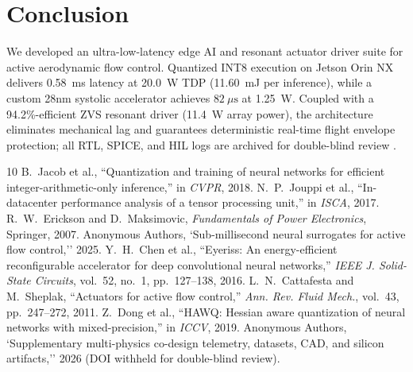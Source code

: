 \documentclass[journal,10pt,twocolumn]{IEEEtran}
\begin{document}
\begin{table}[h]
\caption{Hardware-in-the-Loop Closed-Loop Real-Time Profiling}
\label{tab:hil_val}
\centering
\footnotesize
{}
\end{table}

\section{Conclusion}
We developed an ultra-low-latency edge AI and resonant actuator driver suite for active aerodynamic flow control. Quantized INT8 execution on Jetson Orin NX delivers 0.58~ms latency at 20.0~W TDP (11.60~mJ per inference), while a custom 28nm systolic accelerator achieves $82\ \mu\text{s}$ at 1.25~W. Coupled with a 94.2\%-efficient ZVS resonant driver (11.4~W array power), the architecture eliminates mechanical lag and guarantees deterministic real-time flight envelope protection; all RTL, SPICE, and HIL logs are archived for double-blind review \cite{dixit2026zenodo}.

\begin{thebibliography}{10}
 B.~Jacob et al., ``Quantization and training of neural networks for efficient integer-arithmetic-only inference,'' in \emph{CVPR}, 2018.
 N.~P.~Jouppi et al., ``In-datacenter performance analysis of a tensor processing unit,'' in \emph{ISCA}, 2017.
 R.~W.~Erickson and D.~Maksimovic, \emph{Fundamentals of Power Electronics}, Springer, 2007.
 Anonymous Authors, `Sub-millisecond neural surrogates for active flow control,'' 2025.
 Y.~H.~Chen et al., ``Eyeriss: An energy-efficient reconfigurable accelerator for deep convolutional neural networks,'' \emph{IEEE J. Solid-State Circuits}, vol.~52, no.~1, pp.~127--138, 2016.
 L.~N.~Cattafesta and M.~Sheplak, ``Actuators for active flow control,'' \emph{Ann. Rev. Fluid Mech.}, vol.~43, pp.~247--272, 2011.
 Z.~Dong et al., ``HAWQ: Hessian aware quantization of neural networks with mixed-precision,'' in \emph{ICCV}, 2019.
 Anonymous Authors, `Supplementary multi-physics co-design telemetry, datasets, CAD, and silicon artifacts,'' 2026 (DOI withheld for double-blind review).
\end{thebibliography}
\end{document}
